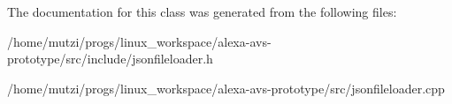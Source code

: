 The documentation for this class was generated from the following files\+:\begin{DoxyCompactItemize}
\item 
/home/mutzi/progs/linux\+\_\+workspace/alexa-\/avs-\/prototype/src/include/jsonfileloader.\+h\item 
/home/mutzi/progs/linux\+\_\+workspace/alexa-\/avs-\/prototype/src/jsonfileloader.\+cpp\end{DoxyCompactItemize}
